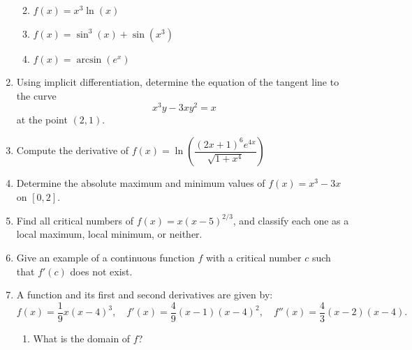 \documentclass[12pt]{article}
\newcommand{\points}[1]{\marginpar{\hspace{24pt}[#1]}}
\begin{document}
\begin{enumerate}
\begin{enumerate}
 \vspace{1.5in}
 
 \item $f(x) = x^3\ln(x)$ \points{2}
 
 \vspace{1.25in}
 
 \item $f(x) = \sin^3(x)+\sin(x^3)$ \points{2}
 
 \vspace{1.5in}
 
 \item $f(x) = \arcsin(e^x)$ \points{2}
 \end{enumerate}
 \newpage
 
 \item Using implicit differentiation, determine the equation of the tangent line to the curve \points{6}
 \[
 x^3y-3xy^2=x
 \]
 at the point $(2,1)$.
 
 \vspace{3.75in}
 
 \item Compute the derivative of \points{4}
 $f(x) = \ln\left(\dfrac{(2x+1)^6e^{4x}}{\sqrt{1+x^4}}\right)$ 
 
 

 \newpage
 
 \item Determine the absolute maximum and minimum values of $f(x) = x^3-3x$ on $[0,2]$. \points{4}
 
 \vspace{3.25in}
 
 \item Find all critical numbers of $f(x) = x(x-5)^{2/3}$, and classify each one as a local maximum, local minimum, or neither. \points{4}
 
 \vspace{3.25in}
 
 \item Give an example of a continuous function $f$ with a critical number $c$ such that $f'(c)$ does not exist. \points{2} 
 
 \newpage
 
 \item A function and its first and second derivatives are given by:
 \[
 f(x)=\frac{1}{9}x(x-4)^3,\quad f'(x) = \frac{4}{9}(x-1)(x-4)^2, \quad f''(x) = \frac{4}{3}(x-2)(x-4).
 \]
  
   
  \begin{enumerate}
  \item What is the domain of $f$? \points{1}
  

\end{enumerate}
\end{enumerate}
\end{document}
